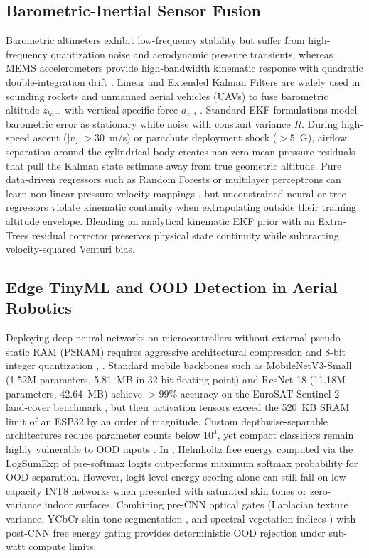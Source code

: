 \documentclass[conference]{IEEEtran}
\begin{document}
\subsection{Barometric-Inertial Sensor Fusion}
Barometric altimeters exhibit low-frequency stability but suffer from high-frequency quantization noise and aerodynamic pressure transients, whereas MEMS accelerometers provide high-bandwidth kinematic response with quadratic double-integration drift \cite{kalman_baro_imu}. Linear and Extended Kalman Filters are widely used in sounding rockets and unmanned aerial vehicles (UAVs) to fuse barometric altitude $z_{baro}$ with vertical specific force $a_z$ \cite{uav_baro_ekf}, \cite{sounding_rocket_nav}. Standard EKF formulations model barometric error as stationary white noise with constant variance $R$. During high-speed ascent ($|v_z| > 30$~m/s) or parachute deployment shock ($>5$~G), airflow separation around the cylindrical body creates non-zero-mean pressure residuals that pull the Kalman state estimate away from true geometric altitude. Pure data-driven regressors such as Random Forests or multilayer perceptrons can learn non-linear pressure-velocity mappings \cite{breiman_rf}, but unconstrained neural or tree regressors violate kinematic continuity when extrapolating outside their training altitude envelope. Blending an analytical kinematic EKF prior with an Extra-Trees residual corrector \cite{geurts_extratrees} preserves physical state continuity while subtracting velocity-squared Venturi bias.

\subsection{Edge TinyML and OOD Detection in Aerial Robotics}
Deploying deep neural networks on microcontrollers without external pseudo-static RAM (PSRAM) requires aggressive architectural compression and 8-bit integer quantization \cite{tflite_micro_david}, \cite{cmsis_nn_lai}. Standard mobile backbones such as MobileNetV3-Small (1.52M parameters, 5.81~MB in 32-bit floating point) \cite{howard_mobilenetv3} and ResNet-18 (11.18M parameters, 42.64~MB) \cite{he_resnet} achieve $>99\%$ accuracy on the EuroSAT Sentinel-2 land-cover benchmark \cite{eurosat_helber}, but their activation tensors exceed the 520~KB SRAM limit of an ESP32 by an order of magnitude. Custom depthwise-separable architectures reduce parameter counts below $10^4$, yet compact classifiers remain highly vulnerable to OOD inputs \cite{hendrycks_msp}. In \cite{energy_ood_liu}, Helmholtz free energy computed via the LogSumExp of pre-softmax logits outperforms maximum softmax probability for OOD separation. However, logit-level energy scoring alone can still fail on low-capacity INT8 networks when presented with saturated skin tones or zero-variance indoor surfaces. Combining pre-CNN optical gates (Laplacian texture variance, YCbCr skin-tone segmentation \cite{chai_skin_ycbcr}, and spectral vegetation indices \cite{gitelson_vari}) with post-CNN free energy gating provides deterministic OOD rejection under sub-watt compute limits.
\end{document}
